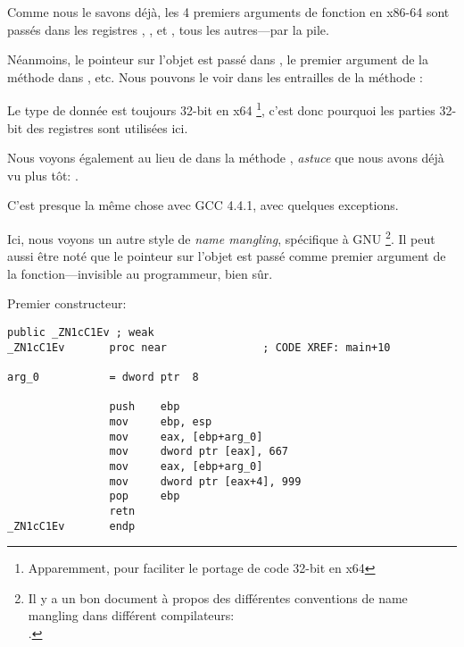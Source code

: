 \label{simple_CPP_MSVC_x64}

Comme nous le savons déjà, les 4 premiers arguments de fonction en x86-64 sont passés
dans les registres \RCX, \RDX,  et , tous les autres---par la pile.

Néanmoins, le pointeur \ITthis sur l'objet est passé dans \RCX, le premier argument
de la méthode dans \RDX, etc.
Nous pouvons le voir dans les entrailles de la méthode :



Le type de donnée \Tint est toujours 32-bit en x64
\footnote{Apparemment, pour faciliter le portage de code 32-bit \CCpp en x64},
c'est donc pourquoi les parties 32-bit des registres sont utilisées ici.

Nous voyons également  au lieu de \RET dans la méthode ,
\emph{astuce} que nous avons déjà vu plus tôt: .


C'est presque la même chose avec GCC 4.4.1, avec quelques exceptions.



Ici, nous voyons un autre style de \emph{name mangling}, spécifique à GNU
\footnote{Il y a un bon document à propos des différentes conventions de name mangling
dans différent compilateurs:\\
\InSqBrackets{\AgnerFogCC}.}.
Il peut aussi être noté que le pointeur sur l'objet est passé comme premier argument
de la fonction---invisible au programmeur, bien sûr.


Premier constructeur:

\begin{lstlisting}[style=customasmx86]
                public _ZN1cC1Ev ; weak
_ZN1cC1Ev       proc near               ; CODE XREF: main+10

arg_0           = dword ptr  8

                push    ebp
                mov     ebp, esp
                mov     eax, [ebp+arg_0]
                mov     dword ptr [eax], 667
                mov     eax, [ebp+arg_0]
                mov     dword ptr [eax+4], 999
                pop     ebp
                retn
_ZN1cC1Ev       endp
\end{lstlisting}

